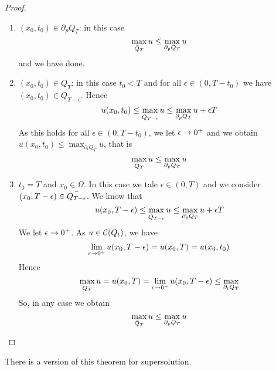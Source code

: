 \begin{ProofBox}
\begin{proof}
\begin{enumerate}
            \item $(x_0,t_0) \in \partial_p Q_T$: in this case 
            \begin{equation*}
                \max_{\Bar{Q}_T} u \leq \max_{\partial_p Q_T} u
            \end{equation*}
            and we have done.
            \item $(x_0,t_0) \in Q_T$: in this case $t_0 < T$ and for all $\epsilon \in (0,T-t_0)$ we have $(x_0,t_0) \in Q_{T-\epsilon}$. Hence
            \begin{equation*}
                u(x_0,t_0) \leq \max_{\Bar{Q}_{T-\epsilon}} u \leq \max_{\partial_p Q_T} u + \epsilon T
            \end{equation*}
            As this holds for all $\epsilon \in (0,T-t_0)$, we let $\epsilon \rightarrow 0^+$ and we obtain $u(x_0,t_0) \leq \max_{\partial_t Q_T}u$, that is 
            \begin{equation*}
                \max_{\Bar{Q}_T} u\leq \max_{\partial_pQ_T}u
            \end{equation*}
            \item $t_0 = T$ and $x_0 \in \Omega$. In this case we tale $\epsilon \in (0,T)$ and we consider $(x_0, T-\epsilon) \in \Bar{Q_{T-\epsilon}}$. We know that 
            \begin{equation*}
                u(x_0, T-\epsilon) \leq \max_{\Bar{Q}_{T-\epsilon}} u \leq \max_{\partial_p Q_T} u + \epsilon T
            \end{equation*}
            We let $\epsilon \rightarrow 0^+$. As $u \in \mathcal{C}(\Bar{Q}_t)$, we have 
            \begin{equation*}
                \lim_{\epsilon \rightarrow 0^+} u(x_0,T-\epsilon) = u(x_0,T) = u(x_0,t_0)
            \end{equation*}
            Hence
            \begin{equation*}
                \max_{\Bar{Q}_T} u = u(x_0,T) = \lim_{\epsilon \rightarrow 0^+} u(x_0, T-\epsilon) \leq \max_{\partial_t Q_T}
            \end{equation*}
            So, in any case we obtain
            \begin{equation*}
                \max_{\Bar{Q}_T} u \leq \max_{\partial_p Q_T} u
            \end{equation*}
        \end{enumerate}
    \end{proof}
\end{ProofBox}
There is a version of this theorem for supersolution.
